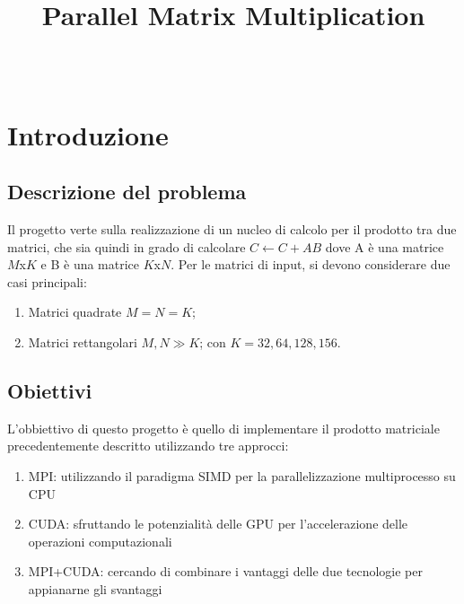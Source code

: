 \documentclass[conference]{IEEEtran}
\begin{document}
\title{Parallel Matrix Multiplication\\
}

\author{
\and
{}
\\
}

\thispagestyle{plain}
\pagestyle{plain}

\maketitle

\begin{abstract}
\end{abstract}

\section{Introduzione}
\subsection{Descrizione del problema}
Il progetto verte sulla realizzazione di un nucleo di calcolo per il prodotto tra due matrici, che sia quindi in grado di calcolare
$C \leftarrow C + AB$
dove A è una matrice $M$x$K$ e B è una matrice $K$x$N$. Per le matrici di input, si devono considerare due casi principali:
\begin{enumerate}
    \item Matrici quadrate $M = N = K$;
    \item Matrici rettangolari $M, N \gg K$; con $K = 32, 64, 128, 156$.
\end{enumerate}

\subsection{Obiettivi}
L'obbiettivo di questo progetto è quello di implementare il prodotto matriciale precedentemente descritto utilizzando tre approcci:
\begin{enumerate}
    \item MPI: utilizzando il paradigma SIMD per la parallelizzazione multiprocesso su CPU
    \item CUDA: sfruttando le potenzialità delle GPU per l'accelerazione delle operazioni computazionali
    \item MPI+CUDA: cercando di combinare i vantaggi delle due tecnologie per appianarne gli svantaggi
\end{enumerate}
\end{document}
